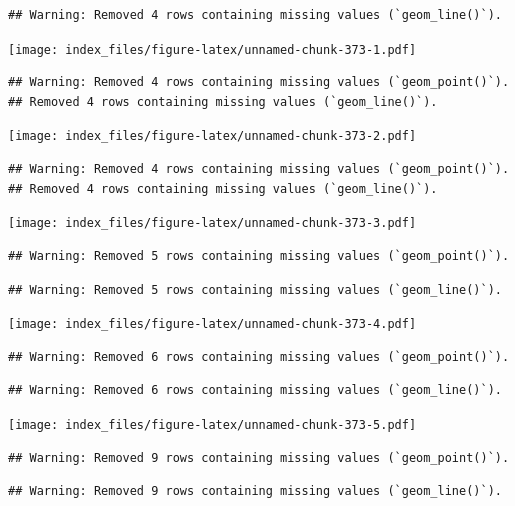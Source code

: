 \documentclass[
]{article}
\begin{document}
\begin{verbatim}
## Warning: Removed 4 rows containing missing values (`geom_line()`).
\end{verbatim}

\texttt{[image: index\_files/figure-latex/unnamed-chunk-373-1.pdf]}

\begin{verbatim}
## Warning: Removed 4 rows containing missing values (`geom_point()`).
## Removed 4 rows containing missing values (`geom_line()`).
\end{verbatim}

\texttt{[image: index\_files/figure-latex/unnamed-chunk-373-2.pdf]}

\begin{verbatim}
## Warning: Removed 4 rows containing missing values (`geom_point()`).
## Removed 4 rows containing missing values (`geom_line()`).
\end{verbatim}

\texttt{[image: index\_files/figure-latex/unnamed-chunk-373-3.pdf]}

\begin{verbatim}
## Warning: Removed 5 rows containing missing values (`geom_point()`).
\end{verbatim}

\begin{verbatim}
## Warning: Removed 5 rows containing missing values (`geom_line()`).
\end{verbatim}

\texttt{[image: index\_files/figure-latex/unnamed-chunk-373-4.pdf]}

\begin{verbatim}
## Warning: Removed 6 rows containing missing values (`geom_point()`).
\end{verbatim}

\begin{verbatim}
## Warning: Removed 6 rows containing missing values (`geom_line()`).
\end{verbatim}

\texttt{[image: index\_files/figure-latex/unnamed-chunk-373-5.pdf]}

\begin{verbatim}
## Warning: Removed 9 rows containing missing values (`geom_point()`).
\end{verbatim}

\begin{verbatim}
## Warning: Removed 9 rows containing missing values (`geom_line()`).
\end{verbatim}
\end{document}
